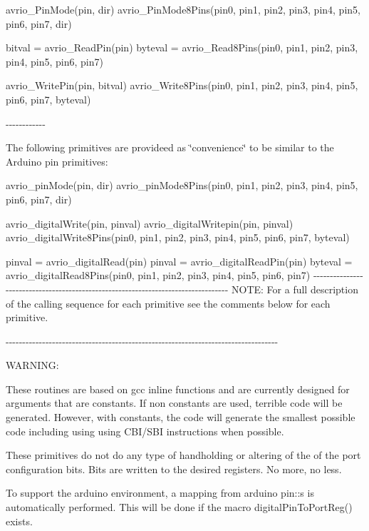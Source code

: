 avrio\_\-PinMode(pin, dir) avrio\_\-PinMode8Pins(pin0, pin1, pin2, pin3, pin4, pin5, pin6, pin7, dir)

bitval = avrio\_\-ReadPin(pin) byteval = avrio\_\-Read8Pins(pin0, pin1, pin2, pin3, pin4, pin5, pin6, pin7)

avrio\_\-WritePin(pin, bitval) avrio\_\-Write8Pins(pin0, pin1, pin2, pin3, pin4, pin5, pin6, pin7, byteval)

-\/-\/-\/-\/-\/-\/-\/-\/-\/-\/-\/-\/

The following primitives are provideed as \char`\"{}convenience\char`\"{} to be similar to the Arduino pin primitives:

avrio\_\-pinMode(pin, dir) avrio\_\-pinMode8Pins(pin0, pin1, pin2, pin3, pin4, pin5, pin6, pin7, dir)

avrio\_\-digitalWrite(pin, pinval) avrio\_\-digitalWritepin(pin, pinval) avrio\_\-digitalWrite8Pins(pin0, pin1, pin2, pin3, pin4, pin5, pin6, pin7, byteval)

pinval = avrio\_\-digitalRead(pin) pinval = avrio\_\-digitalReadPin(pin) byteval = avrio\_\-digitalRead8Pins(pin0, pin1, pin2, pin3, pin4, pin5, pin6, pin7) -\/-\/-\/-\/-\/-\/-\/-\/-\/-\/-\/-\/-\/-\/-\/-\/-\/-\/-\/-\/-\/-\/-\/-\/-\/-\/-\/-\/-\/-\/-\/-\/-\/-\/-\/-\/-\/-\/-\/-\/-\/-\/-\/-\/-\/-\/-\/-\/-\/-\/-\/-\/-\/-\/-\/-\/-\/-\/-\/-\/-\/-\/-\/-\/-\/-\/-\/-\/-\/-\/-\/-\/-\/-\/-\/-\/-\/-\/-\/-\/-\/-\/ NOTE: For a full description of the calling sequence for each primitive see the comments below for each primitive.

-\/-\/-\/-\/-\/-\/-\/-\/-\/-\/-\/-\/-\/-\/-\/-\/-\/-\/-\/-\/-\/-\/-\/-\/-\/-\/-\/-\/-\/-\/-\/-\/-\/-\/-\/-\/-\/-\/-\/-\/-\/-\/-\/-\/-\/-\/-\/-\/-\/-\/-\/-\/-\/-\/-\/-\/-\/-\/-\/-\/-\/-\/-\/-\/-\/-\/-\/-\/-\/-\/-\/-\/-\/-\/-\/-\/-\/-\/-\/-\/-\/-\/

WARNING:

These routines are based on gcc inline functions and are currently designed for arguments that are constants. If non constants are used, terrible code will be generated. However, with constants, the code will generate the smallest possible code including using using CBI/SBI instructions when possible.

These primitives do not do any type of handholding or altering of the of the port configuration bits. Bits are written to the desired registers. No more, no less.

To support the arduino environment, a mapping from arduino pin::s is automatically performed. This will be done if the macro digitalPinToPortReg() exists. 